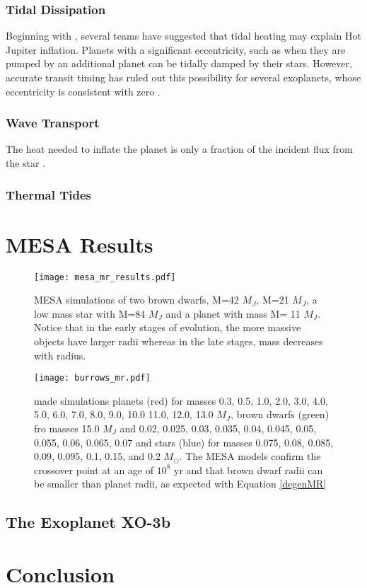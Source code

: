 \documentclass[twocolumn]{emulateapj}
\begin{document}
\subsubsection{Tidal Dissipation}
Beginning with \citet{bodenheimer01}, several teams have suggested that tidal heating may explain Hot Jupiter inflation. Planets with a significant eccentricity, such as when they are pumped by an additional planet can be tidally damped by their stars. However, accurate transit timing has ruled out this possibility for several exoplanets, whose eccentricity is consistent with zero \citet{forneyRev10}.
\subsubsection{Wave Transport}
The heat needed to inflate the planet is only a fraction of the incident flux from the star \citep{ibgui2010}.
\subsubsection{Thermal Tides}
\section{MESA Results}
\begin{figure*}[!htbp]
\begin{center}
\texttt{[image: mesa\_mr\_results.pdf]}
\caption{MESA simulations of two brown dwarfs, M=42 $M_J$, M=21 $M_J$, a low mass star with M=84 $M_J$ and a planet with mass M= 11 $M_J$. Notice that in the early stages of evolution, the more massive objects have larger radii whereas in the late stages, mass decreases with radius.}
\label{mesaMR}
\end{center}
\end{figure*}


\begin{figure*}[!htbp]
\begin{center}
\texttt{[image: burrows\_mr.pdf]}
\caption{\citet{burrows2010} made simulations planets (red) for masses 0.3, 0.5, 1.0, 2.0, 3.0, 4.0, 5.0, 6.0, 7.0, 8.0, 9.0, 10.0 11.0, 12.0, 13.0 $M_J$, brown dwarfs (green) fro masses 15.0 $M_J$ and 0.02, 0.025, 0.03, 0.035, 0.04, 0.045, 0.05, 0.055, 0.06, 0.065, 0.07 and stars (blue) for masses 0.075, 0.08, 0.085, 0.09, 0.095, 0.1, 0.15, and 0.2 $M_\odot$. The MESA models confirm the crossover point at an age of $10^8$ yr and that brown dwarf radii can be smaller than planet radii, as expected with Equation \ref{degenMR}}
\label{burrowsMR}
\end{center}
\end{figure*}

\subsection{The Exoplanet XO-3b}
\section{Conclusion}

%
\end{document}
